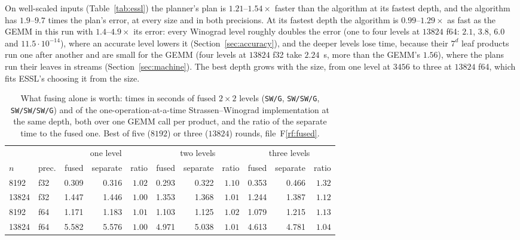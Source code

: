 \documentclass[11pt]{article}
\newcommand{\rf}[1]{F\ref{rf:#1}}
\newcommand{\lv}[1]{\texttt{#1}}
\begin{document}
On well-scaled inputs (Table~\ref{tab:essl}) the planner's plan is
$1.21$--$1.54\times$ faster than the algorithm at its fastest depth, and the algorithm has $1.9$--$9.7$ times the plan's error, at every size and in both precisions.  At its
fastest depth the algorithm is $0.99$--$1.29\times$ as fast as the GEMM in
this run with $1.4$--$4.9\times$ its error: every Winograd level roughly
doubles the error (one to four levels at $13824$ f64:
$2.1$, $3.8$, $6.0$ and $11.5\cdot10^{-14}$), where an accurate level lowers
it (Section~\ref{sec:accuracy}), and the deeper levels lose time, because
their $7^d$ leaf products run one after another and are small for the GEMM
(four levels at $13824$ f32 take $2.24$~s, more than the GEMM's $1.56$),
where the plans run their leaves in streams (Section~\ref{sec:machine}).
The best depth grows with the size, from one level at $3456$ to three at
$13824$ f64, which fits ESSL's choosing it from the size.

\begin{table}[!tbp]
\centering\footnotesize
\begin{tabular}{llrrrrrrrrr}
\toprule
 & & \multicolumn{3}{c}{one level} & \multicolumn{3}{c}{two levels} & \multicolumn{3}{c}{three levels}\\
\cmidrule(lr){3-5}\cmidrule(lr){6-8}\cmidrule(lr){9-11}
$n$ & prec. & fused & separate & ratio & fused & separate & ratio & fused & separate & ratio\\
\midrule
8192  & f32 & 0.309 & 0.316 & $1.02$ & 0.293 & 0.322 & $1.10$ & 0.353 & 0.466 & $1.32$\\
13824 & f32 & 1.447 & 1.446 & $1.00$ & 1.353 & 1.368 & $1.01$ & 1.244 & 1.387 & $1.12$\\
8192  & f64 & 1.171 & 1.183 & $1.01$ & 1.103 & 1.125 & $1.02$ & 1.079 & 1.215 & $1.13$\\
13824 & f64 & 5.582 & 5.576 & $1.00$ & 4.971 & 5.038 & $1.01$ & 4.613 & 4.781 & $1.04$\\
\bottomrule
\end{tabular}
\caption{What fusing alone is worth: times in seconds of fused $2\times2$
levels (\lv{SW/G}, \lv{SW/SW/G}, \lv{SW/SW/SW/G}) and of the
one-operation-at-a-time Strassen--Winograd implementation at the same depth,
both over one GEMM call per product, and the ratio of the separate time to
the fused one.  Best of five ($8192$) or three ($13824$) rounds, file~\rf{fused}.}
\label{tab:fused}
\end{table}
\end{document}
